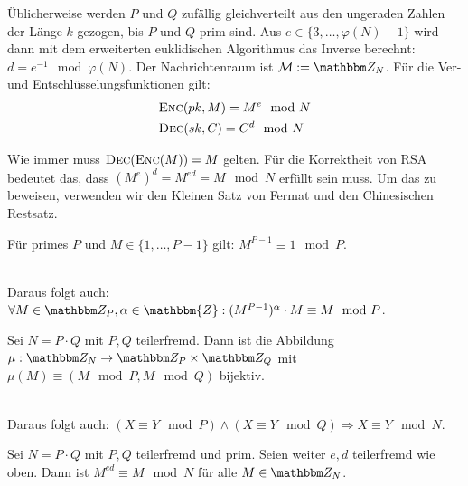 Üblicherweise werden $P$ und $Q$ zufällig gleichverteilt aus den ungeraden Zahlen der Länge $k$ gezogen, bis $P$ und $Q$ prim sind. Aus $e \in \{3, \dotsc ,
\varphi(N) - 1\}$ wird dann mit dem erweiterten euklidischen Algorithmus das Inverse berechnt: $d = e^{-1} \mod \varphi(N)$. Der Nachrichtenraum ist $\mathcal
M := \Z N$. Für die Ver- und Entschlüsselungsfunktionen gilt:
\begin{align*}
& \textsc{Enc}(pk, M) = M^e \mod N\\
& \textsc{Dec}(sk, C) = C^d \mod N
\end{align*}

Wie immer muss $\textsc{Dec}(\textsc{Enc}(M)) = M$ gelten. Für die Korrektheit von RSA bedeutet das, dass $(M^e)^d = M^{ed} = M \mod N$ erfüllt sein muss. Um das zu beweisen,
verwenden wir den Kleinen Satz von Fermat und den Chinesischen Restsatz.

\vspace{10pt}
\begin{theorem}
Für primes $P$ und $M \in \{1, \dotsc, P-1\}$ gilt: $M^{P-1} \equiv 1 \mod P$.
\end{theorem}

~\\
Daraus folgt auch: $\forall M \in \Z P, \alpha \in \mathbbm{Z} : (M^{P-1})^{\alpha} \cdot M \equiv M \mod P$.

\vspace{10pt}
\begin{theorem}
Sei $N = P \cdot Q$ mit $P, Q$ teilerfremd. Dann ist die Abbildung $\mu : \Z N \rightarrow \Z P \times \Z Q$ mit $\mu(M) \equiv (M \mod P, M \mod Q)$ bijektiv.
\end{theorem}

~\\
Daraus folgt auch: $(X \equiv Y \mod P) \land (X \equiv Y \mod Q) \Rightarrow X \equiv Y \mod N$.

\vspace{10pt}
\begin{theorem}
Sei $N = P \cdot Q$ mit $P, Q$ teilerfremd und prim. Seien weiter $e, d$ teilerfremd wie oben. Dann ist $M^{ed} \equiv M \mod N$ für alle $M \in \Z N$.
\end{theorem}
\vspace{10pt}

